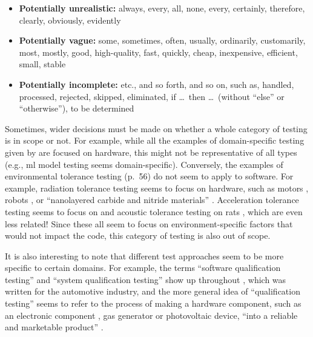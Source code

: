     \begin{itemize}
        \item \textbf{Potentially unrealistic:} always, every, all, none, every,
              certainly, therefore, clearly, obviously, evidently
        \item \textbf{Potentially vague:} some, sometimes, often, usually,
              ordinarily, customarily, most, mostly, good, high-quality, fast,
              quickly, cheap, inexpensive, efficient, small, stable
        \item \textbf{Potentially incomplete:} etc., and so forth, and so on,
              such as, handled, processed, rejected, skipped, eliminated,
              if \dots\ then \dots\ (without ``else'' or ``otherwise''),
              to be determined \citep[p.~408]{vanVliet2000}
    \end{itemize}

    Sometimes, wider decisions must be made on whether a whole category of
    testing is in scope or not. For example, while all the examples of domain-specific
    testing given by \citet[p.~26]{Firesmith2015} are focused on hardware, this
    might not be representative of all types (e.g., \acf{ml} model testing seems
    domain-specific). Conversely, the examples of environmental tolerance testing
    (p.~56) do not seem to apply to software. For example, radiation tolerance
    testing seems to focus on hardware, such as motors \citep{MukhinEtAl2022},
    robots \citep{ZhangEtAl2020}, or ``nanolayered carbide and nitride materials''
    \citep[p.~1]{TunesEtAl2022}. Acceleration tolerance testing seems to focus on
    \accelTolTest{} and acoustic tolerance testing on rats \citep{HolleyEtAl1996},
    which are even less related! Since these all seem to focus on
    environment-specific factors that would not impact the code, this category of
    testing is also out of scope.

    It is also interesting to note that different test approaches seem to be more
    specific to certain domains. For example, the terms ``software qualification
    testing'' and ``system qualification testing'' show up throughout
    \citep{SPICE2022}, which was written for the automotive industry, and the more
    general idea of ``qualification testing'' seems to refer to the process of
    making a hardware component, such as an electronic component
    \citep{AhsanEtAl2020}, gas generator \citep{ParateEtAl2021} or photovoltaic
    device, ``into a reliable and marketable product'' \citep[p.~1]{SuhirEtAl2013}.
\fi

